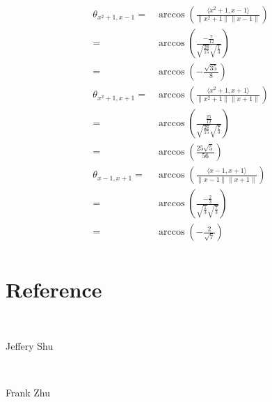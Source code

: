 \documentclass{article}
\begin{document}
\begin{equation*}
    \begin{split}
        \theta_{x^2+1,x-1}=&\arccos( \frac{\langle x^2+1,x-1\rangle}{\|x^2+1\|\|x-1\|})\\
        =&\arccos(\frac{-\frac{7}{12}}{\sqrt{\frac{28}{15}}\sqrt{\frac{1}{3}}})\\
        =&\arccos(-\frac{\sqrt{35}}{8})\\  
        \theta_{x^2+1,x+1}=&\arccos( \frac{\langle x^2+1,x+1\rangle}{\|x^2+1\|\|x+1\|})\\
        =&\arccos(\frac{\frac{25}{12}}{\sqrt{\frac{28}{15}}\sqrt{\frac{7}{3}}})\\
        =&\arccos(\frac{25\sqrt{5}}{56})\\
        \theta_{x-1,x+1}=&\arccos( \frac{\langle x-1,x+1\rangle}{\|x-1\|\|x+1\|})\\
        =&\arccos(\frac{-\frac{2}{3}}{\sqrt{\frac{1}{3}}\sqrt{\frac{7}{3}}})\\
        =&\arccos(-\frac{2}{\sqrt{7}})\\
    \end{split}
\end{equation*}

\newpage

\section{Reference}

~

Jeffery Shu

~

Frank Zhu
\end{document}

